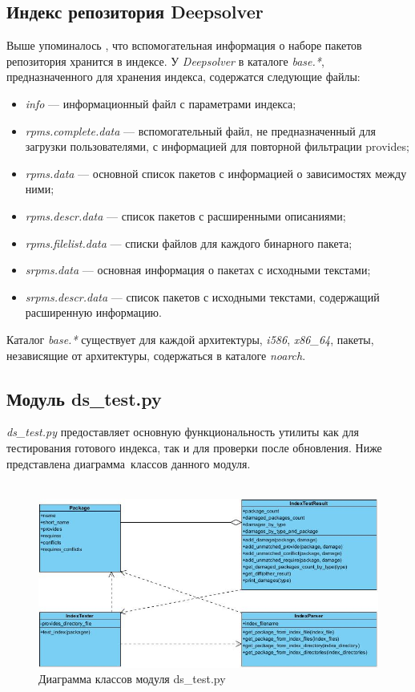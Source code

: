\subsection{Индекс репозитория Deepsolver}
Выше упоминалось , что вспомогательная информация о наборе пакетов репозитория
хранится в индексе. У \textit{Deepsolver} в каталоге \textit{base.*}, предназначенного для хранения индекса,
содержатся следующие файлы:\\
\begin{itemize}
\item{\textit{info} --- информационный файл с параметрами индекса;} 
\item{\textit{rpms.complete.data} --- вспомогательный файл, не предназначенный
для загрузки пользователями, с информацией для повторной фильтрации
provides;}
\item{\textit{rpms.data} --- основной список пакетов с информацией о зависимостях между ними;}
\item{\textit{rpms.descr.data} --- список пакетов с расширенными описаниями;}
\item{\textit{rpms.filelist.data} --- списки файлов для каждого бинарного пакета;}
\item{\textit{srpms.data} --- основная информация о пакетах с исходными текстами;}
\item{\textit{srpms.descr.data} --- список пакетов с исходными текстами, содержащий
расширенную информацию.}
\end{itemize} 
Каталог  \textit{base.*} существует для каждой архитектуры, \textit{i586}, \textit{x86\_64}, пакеты,
независящие от архитектуры, содержаться в каталоге \textit{noarch}.\\

\subsection{Модуль ds\_test.py}
\textit{ds\_test.py} предоставляет основную функциональность утилиты  как для тестирования
готового индекса, так и для проверки после обновления. Ниже представлена диаграмма~классов данного модуля.\\
\\
\begin{figure}[!ht]
\begin{center}
\includegraphics[scale=0.6, clip]{../resources/uml/ds_test_class_diagram.jpg}
\caption{Диаграмма классов модуля ds\_test.py}
\label{gr:dstestclassdiag}
\end{center}
\end{figure}

